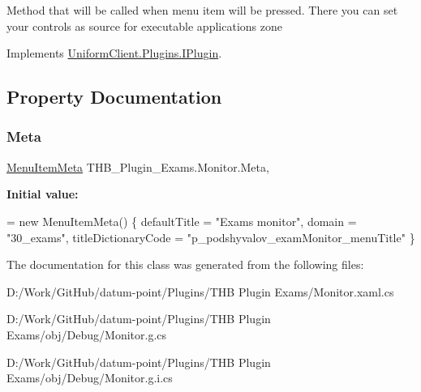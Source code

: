 Method that will be called when menu item will be pressed. There you can set your controls as source for executable application\textquotesingle{}s zone 



Implements \mbox{\hyperlink{interface_uniform_client_1_1_plugins_1_1_i_plugin_a1ca2220c7ce4a23f8f41af10efccf328}{Uniform\+Client.\+Plugins.\+I\+Plugin}}.



\subsection{Property Documentation}
\mbox{\label{class_t_h_b___plugin___exams_1_1_monitor_ac96dc019e2e0865c1c3b9a48a74a7015}} 
\subsubsection{\texorpdfstring{Meta}{Meta}}
{\footnotesize\ttfamily \mbox{\hyperlink{class_uniform_client_1_1_plugins_1_1_menu_item_meta}{Menu\+Item\+Meta}} T\+H\+B\+\_\+\+Plugin\+\_\+\+Exams.\+Monitor.\+Meta\hspace{0.3cm}{\ttfamily [get]}, {\ttfamily [set]}}

{\bfseries Initial value\+:}
\begin{DoxyCode}
= \textcolor{keyword}{new} MenuItemMeta()
        \{
            defaultTitle = \textcolor{stringliteral}{"Exams monitor"},
            domain = \textcolor{stringliteral}{"30\_exams"},
            titleDictionaryCode = \textcolor{stringliteral}{"p\_podshyvalov\_examMonitor\_menuTitle"}
        \}
\end{DoxyCode}


The documentation for this class was generated from the following files\+:\begin{DoxyCompactItemize}
\item 
D\+:/\+Work/\+Git\+Hub/datum-\/point/\+Plugins/\+T\+H\+B Plugin Exams/Monitor.\+xaml.\+cs\item 
D\+:/\+Work/\+Git\+Hub/datum-\/point/\+Plugins/\+T\+H\+B Plugin Exams/obj/\+Debug/Monitor.\+g.\+cs\item 
D\+:/\+Work/\+Git\+Hub/datum-\/point/\+Plugins/\+T\+H\+B Plugin Exams/obj/\+Debug/Monitor.\+g.\+i.\+cs\end{DoxyCompactItemize}
